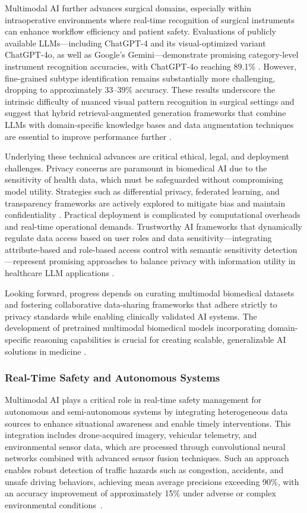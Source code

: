 \documentclass[sigconf]{acmart}
\begin{document}
Multimodal AI further advances surgical domains, especially within intraoperative environments where real-time recognition of surgical instruments can enhance workflow efficiency and patient safety. Evaluations of publicly available LLMs—including ChatGPT-4 and its visual-optimized variant ChatGPT-4o, as well as Google's Gemini—demonstrate promising category-level instrument recognition accuracies, with ChatGPT-4o reaching 89.1\% \cite{ref26}. However, fine-grained subtype identification remains substantially more challenging, dropping to approximately 33–39\% accuracy. These results underscore the intrinsic difficulty of nuanced visual pattern recognition in surgical settings and suggest that hybrid retrieval-augmented generation frameworks that combine LLMs with domain-specific knowledge bases and data augmentation techniques are essential to improve performance further \cite{ref26}.

Underlying these technical advances are critical ethical, legal, and deployment challenges. Privacy concerns are paramount in biomedical AI due to the sensitivity of health data, which must be safeguarded without compromising model utility. Strategies such as differential privacy, federated learning, and transparency frameworks are actively explored to mitigate bias and maintain confidentiality \cite{ref12}. Practical deployment is complicated by computational overheads and real-time operational demands. Trustworthy AI frameworks that dynamically regulate data access based on user roles and data sensitivity—integrating attribute-based and role-based access control with semantic sensitivity detection—represent promising approaches to balance privacy with information utility in healthcare LLM applications \cite{ref11}.

Looking forward, progress depends on curating multimodal biomedical datasets and fostering collaborative data-sharing frameworks that adhere strictly to privacy standards while enabling clinically validated AI systems. The development of pretrained multimodal biomedical models incorporating domain-specific reasoning capabilities is crucial for creating scalable, generalizable AI solutions in medicine \cite{ref12}.

\subsubsection{Real-Time Safety and Autonomous Systems}

Multimodal AI plays a critical role in real-time safety management for autonomous and semi-autonomous systems by integrating heterogeneous data sources to enhance situational awareness and enable timely interventions. This integration includes drone-acquired imagery, vehicular telemetry, and environmental sensor data, which are processed through convolutional neural networks combined with advanced sensor fusion techniques. Such an approach enables robust detection of traffic hazards such as congestion, accidents, and unsafe driving behaviors, achieving mean average precisions exceeding 90\%, with an accuracy improvement of approximately 15\% under adverse or complex environmental conditions~\cite{ref27}.
\end{document}
